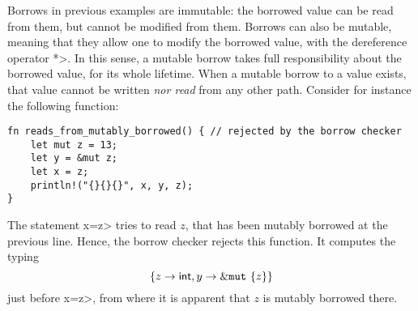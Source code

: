 Borrows in previous examples are immutable: the borrowed value can be read
from them, but cannot be modified from them.
Borrows can also be mutable, meaning that they allow one to modify the
borrowed value, with the dereference operator \<*>. In this sense,
a mutable borrow takes full responsibility about the borrowed value, for its
whole lifetime. When a mutable borrow to a value exists, that value cannot
be written \emph{nor read} from any other path. Consider for instance
the following function:

\begin{verbatim}
fn reads_from_mutably_borrowed() { // rejected by the borrow checker
    let mut z = 13;
    let y = &mut z;
    let x = z;
    println!("{}{}{}", x, y, z);
}
\end{verbatim}

\noindent
The statement \<x=z> tries to read $z$, that has been mutably borrowed
at the previous line. Hence, the borrow checker rejects this function.
It computes the typing
\[
\{z\to\mathsf{int},y\to\&\mathtt{mut}\ \{z\}\}
\]
just before \<x=z>, from where it is apparent that $z$ is mutably borrowed there.

%
%

%
%
